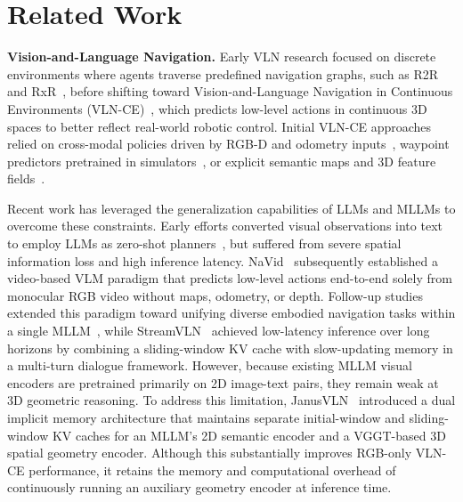 \chapter{Related Work}
\label{ch:related_work}

\textbf{Vision-and-Language Navigation.} Early VLN research focused on discrete environments where agents traverse predefined navigation graphs, such as R2R~\cite{anderson2018vision} and RxR~\cite{ku2020room}, before shifting toward Vision-and-Language Navigation in Continuous Environments (VLN-CE)~\cite{krantz2020beyond}, which predicts low-level actions in continuous 3D spaces to better reflect real-world robotic control. Initial VLN-CE approaches relied on cross-modal policies driven by RGB-D and odometry inputs~\cite{krantz2020beyond}, waypoint predictors pretrained in simulators~\cite{an2023etpnav}, or explicit semantic maps and 3D feature fields~\cite{wang2023gridmm,wang2025g3d}.

Recent work has leveraged the generalization capabilities of LLMs and MLLMs to overcome these constraints. Early efforts converted visual observations into text to employ LLMs as zero-shot planners~\cite{zhou2023navgpt,long2024instructnav}, but suffered from severe spatial information loss and high inference latency. NaVid~\cite{zhang2024navid} subsequently established a video-based VLM paradigm that predicts low-level actions end-to-end solely from monocular RGB video without maps, odometry, or depth. Follow-up studies extended this paradigm toward unifying diverse embodied navigation tasks within a single MLLM~\cite{zhang2025uni,cheng2025navila,gao2026octonav,team2026qwen}, while StreamVLN~\cite{wei2026streamvln} achieved low-latency inference over long horizons by combining a sliding-window KV cache with slow-updating memory in a multi-turn dialogue framework. However, because existing MLLM visual encoders are pretrained primarily on 2D image-text pairs, they remain weak at 3D geometric reasoning. To address this limitation, JanusVLN~\cite{zeng2026janusvln} introduced a dual implicit memory architecture that maintains separate initial-window and sliding-window KV caches for an MLLM's 2D semantic encoder and a VGGT-based 3D spatial geometry encoder. Although this substantially improves RGB-only VLN-CE performance, it retains the memory and computational overhead of continuously running an auxiliary geometry encoder at inference time.

